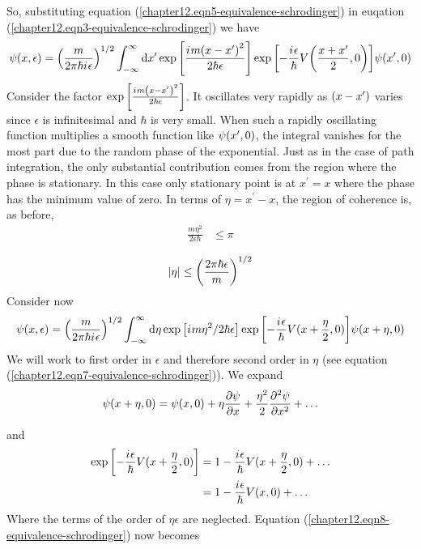 	So, substituting equation (\ref{chapter12.eqn5-equivalence-schrodinger}) in euqation (\ref{chapter12.eqn3-equivalence-schrodinger}) we have
	\begin{equation}
		\psi\qty(x, \epsilon) = \qty(\frac{m}{2\pi\hbar{i\mkern1mu} \epsilon})^{1/2} \int_{-\infty}^{\infty} \dd{x^\prime} \exp\qty[\frac{{i\mkern1mu} m \qty(x-x^\prime)^2}{2 \hbar \epsilon}]   \exp\qty[-\frac{{i\mkern1mu} \epsilon}{\hbar} V\qty(\frac{x+ x^\prime}{2}, 0)]\psi\qty(x^\prime, 0)
		\label{chapter12.eqn6-equivalence-schrodinger}
	\end{equation}
	Consider the factor $\exp\qty[\frac{{i\mkern1mu} m \qty(x-x^\prime)^2}{2 \hbar \epsilon}]$. It oscillates very rapidly as $\qty(x-x^\prime)$ varies since $\epsilon$ is infinitesimal and $\hbar$ is very small. When such a rapidly oscillating function multiplies a smooth function like $\psi\qty(x^\prime, 0)$, the integral vanishes for the most part due to the random phase of the exponential. Just as in the case of path integration, the only substantial contribution comes from the region where the phase is stationary. In this case only stationary point is at $x^\prime = x$ where the phase has the minimum value of zero. In terms of $\eta = x^\prime - x$, the region of coherence is, as before,
	\begin{align*}
		\frac{m \eta^2}{2\epsilon	\hbar} &\leq \pi
	\end{align*}
	
	\begin{align}
		\abs{\eta } \leq \qty(\frac{2 \pi \hbar \epsilon}{m})^{1/2}
		\label{chapter12.eqn7-equivalence-schrodinger}
	\end{align}
	Consider now
	\begin{equation}
		\psi(x, \epsilon) = \qty(\frac{m}{2\pi \hbar {i\mkern1mu} \epsilon})^{1/2} \int_{-\infty}^{\infty} \dd{\eta} \exp\qty[{i\mkern1mu} m \eta^2/2 \hbar \epsilon] \exp\qty[-\frac{{i\mkern1mu} \epsilon}{\hbar} V(x + \frac{\eta}{2}, 0)]  \psi\qty(x + \eta, 0)
		\label{chapter12.eqn8-equivalence-schrodinger}
	\end{equation}
	We will work to first order in $\epsilon$ and therefore second order in $\eta$ (see equation (\ref{chapter12.eqn7-equivalence-schrodinger})). We expand
	\begin{equation}
		\psi\qty(x + \eta, 0) = \psi\qty(x, 0) + \eta \pdv{\psi}{x} + \frac{\eta^2}{2} \pdv[2]{\psi}{x} + \ldots
	\end{equation}
	
	and 
	\begin{align*}
		\exp\qty[-\frac{{i\mkern1mu} \epsilon}{\hbar} V(x + \frac{\eta}{2}, 0)] 
		&= 1 - \frac{{i\mkern1mu} \epsilon}{\hbar} V(x + \frac{\eta}{2}, 0) + \ldots \\
		&= 1 - \frac{{i\mkern1mu} \epsilon}{\hbar} V(x, 0) + \ldots
	\end{align*}
	Where the terms of the order of $\eta \epsilon$ are neglected. Equation (\ref{chapter12.eqn8-equivalence-schrodinger}) now becomes
	
